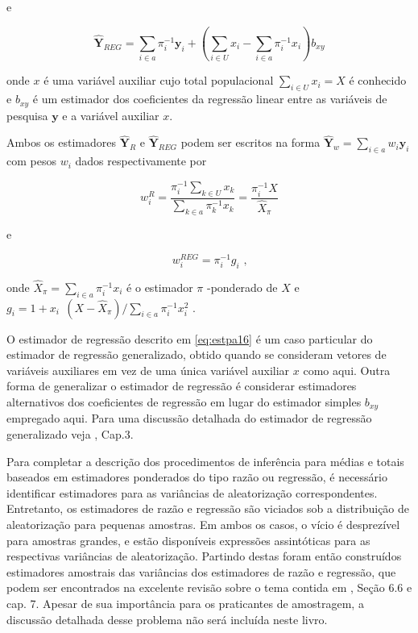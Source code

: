 \documentclass[]{book}
\theoremstyle{definition}
\theoremstyle{definition}
\theoremstyle{definition}
\theoremstyle{remark}
\begin{document}
e

\begin{equation}
\mathbf{\hat{Y}}_{REG} = \sum\limits_{i \in a} {\pi_i^{-1}} \mathbf{y}_i + \left( \sum\limits_{i \in U} x_i - \sum\limits_{i \in a} {\pi_i^{-1}} x_i \right) b_{xy}  \label{eq:estpa16}
\end{equation}

onde \(x\) é uma variável auxiliar cujo total populacional
\(\sum_{i \in U} x_i = X\) é conhecido e \(b_{xy}\) é um estimador dos
coeficientes da regressão linear entre as variáveis de pesquisa
\(\mathbf{y}\) e a variável auxiliar \(x\).

Ambos os estimadores \(\mathbf{\hat{Y}}_R\) e \(\mathbf{\hat{Y}}_{REG}\)
podem ser escritos na forma
\(\mathbf{\hat{Y}}_w = \sum\limits_{i \in a} w_i \mathbf{y}_i\) com
pesos \(w_i\) dados respectivamente por

\begin{equation}
w_i^R = \frac{\pi_i^{-1} \sum_{k \in U} x_k} {\sum\limits_{k \in a} \pi_k^{-1} x_k} = \frac{\pi_i^{-1} X} {\widehat{X}_{\pi}} \label{eq:estpa17} 
\end{equation}

e

\begin{equation}
w_i^{REG} = \pi_i^{-1} g_i \mbox{ ,} \label{eq:estpa18}
\end{equation}

onde \(\widehat{X}_{\pi} = \sum\limits_{i \in a} \pi_i^{-1} x_i\) é o
estimador \(\pi\) -ponderado de \(X\) e
\(g_{i} = 1 + x_{i \mbox{ }} (X - \widehat{X}_{\pi}) / \sum_{i \in a} \pi_i^{-1} x_i^2\)
.

O estimador de regressão descrito em \eqref{eq:estpa16} é um caso
particular do estimador de regressão generalizado, obtido quando se
consideram vetores de variáveis auxiliares em vez de uma única variável
auxiliar \(x\) como aqui. Outra forma de generalizar o estimador de
regressão é considerar estimadores alternativos dos coeficientes de
regressão em lugar do estimador simples \(b_{xy}\) empregado aqui. Para
uma discussão detalhada do estimador de regressão generalizado veja
\citep{Silva}, Cap.3.

Para completar a descrição dos procedimentos de inferência para médias e
totais baseados em estimadores ponderados do tipo razão ou regressão, é
necessário identificar estimadores para as variâncias de aleatorização
correspondentes. Entretanto, os estimadores de razão e regressão são
viciados sob a distribuição de aleatorização para pequenas amostras. Em
ambos os casos, o vício é desprezível para amostras grandes, e estão
disponíveis expressões assintóticas para as respectivas variâncias de
aleatorização. Partindo destas foram então construídos estimadores
amostrais das variâncias dos estimadores de razão e regressão, que podem
ser encontrados na excelente revisão sobre o tema contida em
\citep{SSW92}, Seção 6.6 e cap. 7. Apesar de sua importância para os
praticantes de amostragem, a discussão detalhada desse problema não será
incluída neste livro.
\end{document}
